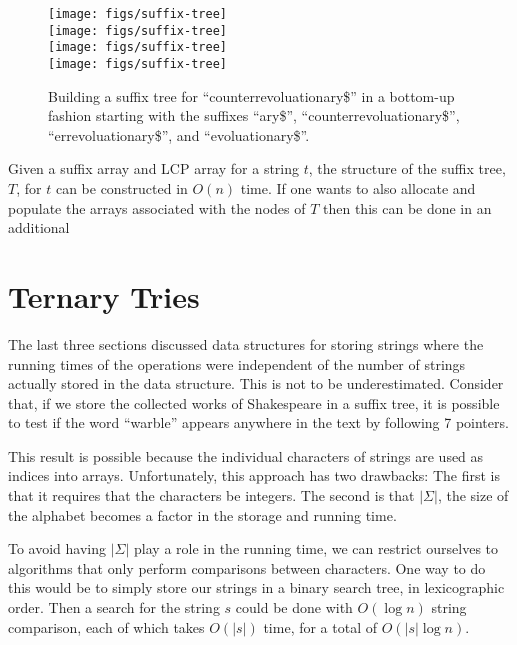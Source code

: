 \begin{figure}
\begin{center}
\texttt{[image: figs/suffix-tree]} \\[1em]
\texttt{[image: figs/suffix-tree]} \\[1em]
\texttt{[image: figs/suffix-tree]} \\[1em]
\texttt{[image: figs/suffix-tree]} \\[1em]
\end{center}
\caption{Building a suffix tree for ``counterrevoluationary\$'' in a bottom-up fashion starting with the suffixes ``ary\$'', ``counterrevoluationary\$'', ``errevoluationary\$'', and ``evoluationary\$''.}
\end{figure}

\begin{thm}
  Given a suffix array and LCP array for a string $t$, the structure of
  the suffix tree, $T$, for $t$ can be constructed in $O(n)$ time.  If one
  wants to also allocate and populate the arrays associated with the
  nodes of $T$ then this can be done in an additional
\end{thm}


\section{Ternary Tries}

The last three sections discussed data structures for storing strings
where the running times of the operations were independent of the
number of strings actually stored in the data structure.  This is not
to be underestimated.  Consider that, if we store the collected works
of Shakespeare in a suffix tree, it is possible to test if the word
``warble'' appears anywhere in the text by following 7 pointers.

This result is possible because the individual characters of strings
are used as indices into arrays.  Unfortunately, this approach has two
drawbacks: The first is that it requires that the characters be integers.
The second is that $|\Sigma|$, the size of the alphabet becomes a factor
in the storage and running time.

To avoid having $|\Sigma|$ play a role in the running time, we can
restrict ourselves to algorithms that only perform comparisons between
characters.  One way to do this would be to simply store our strings in
a binary search tree, in lexicographic order.  Then a search for the
string $s$ could be done with $O(\log n)$ string comparison, each of
which takes $O(|s|)$ time, for a total of $O(|s|\log n)$.

